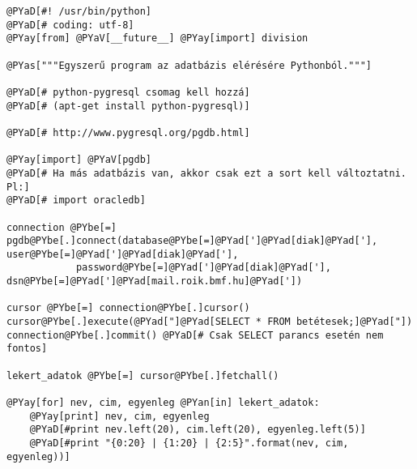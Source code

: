 \begin{Verbatim}[commandchars=@\[\]]
@PYaD[#! /usr/bin/python]
@PYaD[# coding: utf-8]
@PYay[from] @PYaV[__future__] @PYay[import] division

@PYas["""Egyszerű program az adatbázis elérésére Pythonból."""]

@PYaD[# python-pygresql csomag kell hozzá]
@PYaD[# (apt-get install python-pygresql)]

@PYaD[# http://www.pygresql.org/pgdb.html]

@PYay[import] @PYaV[pgdb]
@PYaD[# Ha más adatbázis van, akkor csak ezt a sort kell változtatni. Pl:]
@PYaD[# import oracledb]

connection @PYbe[=] pgdb@PYbe[.]connect(database@PYbe[=]@PYad[']@PYad[diak]@PYad['], user@PYbe[=]@PYad[']@PYad[diak]@PYad['],
		    password@PYbe[=]@PYad[']@PYad[diak]@PYad['], dsn@PYbe[=]@PYad[']@PYad[mail.roik.bmf.hu]@PYad['])

cursor @PYbe[=] connection@PYbe[.]cursor()
cursor@PYbe[.]execute(@PYad["]@PYad[SELECT * FROM betétesek;]@PYad["])
connection@PYbe[.]commit() @PYaD[# Csak SELECT parancs esetén nem fontos]

lekert_adatok @PYbe[=] cursor@PYbe[.]fetchall()

@PYay[for] nev, cim, egyenleg @PYan[in] lekert_adatok:
    @PYay[print] nev, cim, egyenleg
    @PYaD[#print nev.left(20), cim.left(20), egyenleg.left(5)]
    @PYaD[#print "{0:20} | {1:20} | {2:5}".format(nev, cim, egyenleg))]
\end{Verbatim}
